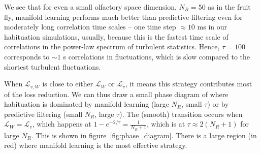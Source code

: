 \documentclass[letter, 12pt]{article}
\begin{document}
We see that for even a small olfactory  space dimension, $N_R = 50$ as in the fruit fly, manifold learning performs much better than predictive filtering even for moderately long correlation time scales -- one time step $\approx 10$ ms in our habituation simulations, usually, because this is the fastest time scale of correlations in the power-law spectrum of turbulent statistics. Hence,  $\tau = 100$ corresponds to $\sim1$ s correlations in fluctuations, which is slow compared to the shortest turbulent fluctuations. 

When $\mathcal{L}_{v, W}$ is close to either $\mathcal{L}_{W}$ or $\mathcal{L}_v$, it means this strategy contributes most of the loss reduction. We can thus draw a small phase diagram of where habituation is dominated by manifold learning (large $N_R$, small $\tau$) or by predictive filtering (small $N_R$, large $\tau$). The (smooth) transition occurs when $\mathcal{L}_W = \mathcal{L}_v$, which happens at $1 - e^{-2/\tau} = \frac{1}{N_R + 1}$, which is at  $\tau \approx 2(N_R + 1)$ for large $N_R$. This is shown in figure~\ref{fig:phase_diagram}. There is a large region (in red) where manifold learning is the most effective strategy. 


%
\printbibliography
\end{document}
